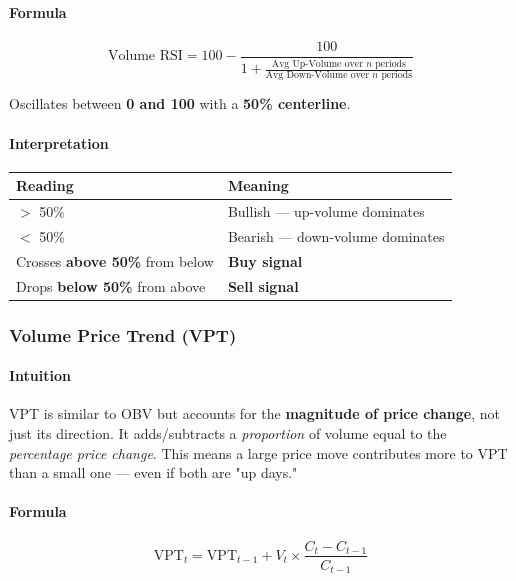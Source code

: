 \documentclass[12pt,openany]{book}
\begin{document}
\paragraph{Formula}

\[
\text{Volume RSI} = 100 - \frac{100}{1 + \frac{\text{Avg Up-Volume over } n \text{ periods}}{\text{Avg Down-Volume over } n \text{ periods}}}
\]

Oscillates between \textbf{0 and 100} with a \textbf{50\% centerline}.

\paragraph{Interpretation}

\begin{center}
\small
\renewcommand{\arraystretch}{1.2}
\begin{tabular}{|L{0.30\textwidth}|L{0.60\textwidth}|}
\hline
 \textbf{Reading} & \textbf{Meaning} \\ \hline
 \(>\) 50\% & Bullish --- up-volume dominates \\ \hline
 \(<\) 50\% & Bearish --- down-volume dominates \\ \hline
 Crosses \textbf{above 50\%} from below & \textbf{Buy signal} \\ \hline
 Drops \textbf{below 50\%} from above & \textbf{Sell signal} \\ \hline
\end{tabular}
\end{center}

\subsubsection{Volume Price Trend (VPT)}

\paragraph{Intuition}
VPT is similar to OBV but accounts for the \textbf{magnitude of price change}, not just its direction. It adds/subtracts a \emph{proportion} of volume equal to the \emph{percentage price change}. This means a large price move contributes more to VPT than a small one --- even if both are "up days."

\paragraph{Formula}

\[
\text{VPT}_t = \text{VPT}_{t-1} + V_t \times \frac{C_t - C_{t-1}}{C_{t-1}}
\]
\end{document}
